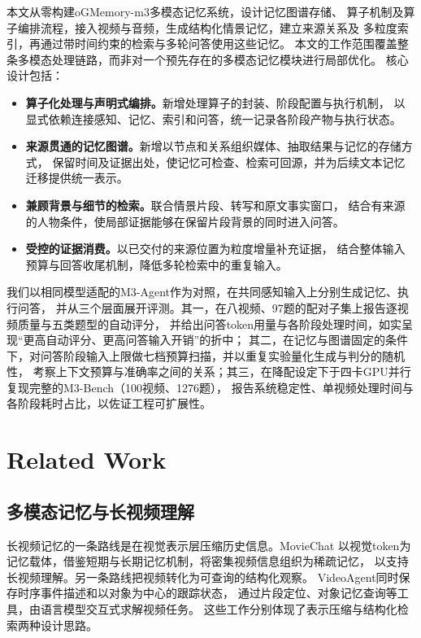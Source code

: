 \documentclass[UTF8,a4paper,11pt,fontset=fandol]{ctexart}
\newcommand*{\memoryprojectname}{oGMemory}
\newcommand*{\memoryprojectnamemthree}{\memoryprojectname-m3}
\begin{document}
本文从零构建\memoryprojectnamemthree{}多模态记忆系统，设计记忆图谱存储、
算子机制及算子编排流程，接入视频与音频，生成结构化情景记忆，建立来源关系及
多粒度索引，再通过带时间约束的检索与多轮问答使用这些记忆。
本文的工作范围覆盖整条多模态处理链路，而非对一个预先存在的多模态记忆模块进行局部优化。
核心设计包括：
\begin{itemize}
\item \textbf{算子化处理与声明式编排。}新增处理算子的封装、阶段配置与执行机制，
以显式依赖连接感知、记忆、索引和问答，统一记录各阶段产物与执行状态。
\item \textbf{来源贯通的记忆图谱。}新增以节点和关系组织媒体、抽取结果与记忆的存储方式，
保留时间及证据出处，使记忆可检查、检索可回源，并为后续文本记忆迁移提供统一表示。
\item \textbf{兼顾背景与细节的检索。}联合情景片段、转写和原文事实窗口，
结合有来源的人物条件，使局部证据能够在保留片段背景的同时进入问答。
\item \textbf{受控的证据消费。}以已交付的来源位置为粒度增量补充证据，
结合整体输入预算与回答收尾机制，降低多轮检索中的重复输入。
\end{itemize}

我们以相同模型适配的M3-Agent作为对照，在共同感知输入上分别生成记忆、执行问答，
并从三个层面展开评测。其一，在八视频、97题的配对子集上报告逐视频质量与五类题型的自动评分，
并给出问答token用量与各阶段处理时间，如实呈现“更高自动评分、更高问答输入开销”的折中；
其二，在记忆与图谱固定的条件下，对问答阶段输入上限做七档预算扫描，并以重复实验量化生成与判分的随机性，
考察上下文预算与准确率之间的关系；其三，在降配设定下于四卡GPU并行复现完整的M3-Bench（100视频、1276题），
报告系统稳定性、单视频处理时间与各阶段耗时占比，以佐证工程可扩展性。

\section{Related Work}
\subsection{多模态记忆与长视频理解}
长视频记忆的一条路线是在视觉表示层压缩历史信息。MovieChat\cite{moviechat}
以视觉token为记忆载体，借鉴短期与长期记忆机制，将密集视频信息组织为稀疏记忆，
以支持长视频理解。另一条路线把视频转化为可查询的结构化观察。
VideoAgent\cite{videoagent}同时保存时序事件描述和以对象为中心的跟踪状态，
通过片段定位、对象记忆查询等工具，由语言模型交互式求解视频任务。
这些工作分别体现了表示压缩与结构化检索两种设计思路。
\end{document}
